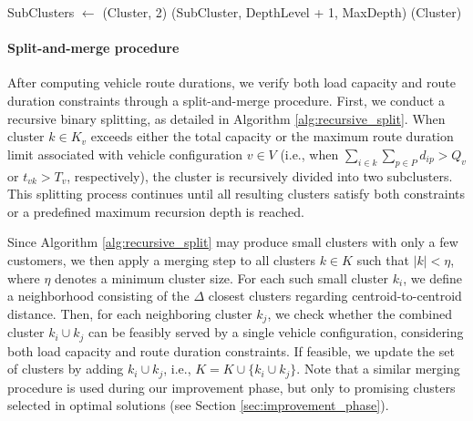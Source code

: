 \documentclass[11pt]{elsarticle}
\theoremstyle{plain}
\begin{document}
\begin{algorithm}[H]
\caption{Recursive Cluster Splitting}
\label{alg:recursive_split}
\begin{algorithmic}[1]
        \State SubClusters $\gets$ (Cluster, 2) 
            \State {}(SubCluster, DepthLevel + 1, MaxDepth)
        \EndFor
    \Else
        \State {}(Cluster) %
    \EndIf
\EndFunction
\end{algorithmic}
\end{algorithm}

\paragraph{Split-and-merge procedure}
After computing vehicle route durations, we verify both load capacity and route duration constraints through a split-and-merge procedure. First, we conduct a recursive binary splitting, as detailed in Algorithm \ref{alg:recursive_split}. When cluster $k \in K_v$ exceeds either the total capacity or the maximum route duration limit associated with vehicle configuration $v \in V$ (i.e., when $\sum_{i \in k} \sum_{p \in P} d_{ip} > Q_v$ or $t_{vk} > T_v$, respectively), the cluster is recursively divided into two subclusters. 
This splitting process continues until all resulting clusters satisfy both constraints or a predefined maximum recursion depth is reached.

Since Algorithm \ref{alg:recursive_split} may produce small clusters with only a few customers, we then apply a merging step to all clusters $k \in K$ such that $|k| < \eta$, where $\eta$ denotes a minimum cluster size. For each such small cluster $k_i$, we define a neighborhood consisting of the $
\Delta$ closest clusters regarding centroid-to-centroid distance. Then, for each neighboring cluster $k_j$, we check whether the combined cluster $k_i \cup k_j$ can be feasibly served by a single vehicle configuration, considering both load capacity and route duration constraints. If feasible, we update the set of clusters by adding $k_i \cup k_j$, i.e., $K = K \cup \{k_i \cup k_j\}$. Note that a similar merging procedure is used during our improvement phase, but only to promising clusters selected in optimal solutions (see Section \ref{sec:improvement_phase}).
\end{document}
